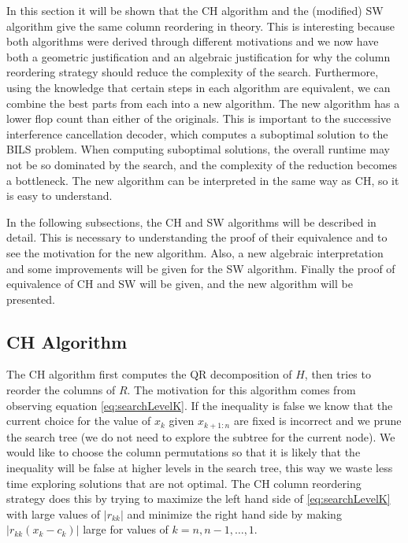 \documentclass[12pt,Bold,letterpaper]{mcgilletdclass}
\newcommand{\vsp}{\vspace{\baselineskip}}
\begin{document}
In this section it will be shown that the CH algorithm and the  (modified)  SW algorithm give the same
column reordering in theory. This is interesting because both algorithms were derived through different motivations
and we now have both a geometric justification and an algebraic justification 
for why the column reordering strategy should reduce the complexity of the search.
Furthermore, using the knowledge that certain steps in each algorithm are equivalent,
we can combine the best parts from each into a new algorithm. The new algorithm
has a lower flop count than either of the originals.
This is important to the successive interference cancellation decoder, 
which computes a suboptimal solution to the BILS problem. When computing suboptimal solutions, the overall runtime may not be so dominated by the search, and the complexity of the reduction becomes a bottleneck.
The new algorithm can be interpreted in the same way as CH,
so it is easy to understand. 

In the following subsections, the CH and SW algorithms will be described in detail. This is necessary to understanding the proof of their equivalence and to see the motivation for the new algorithm. Also, a new algebraic interpretation and some improvements will be given for the SW algorithm. Finally the proof of equivalence of CH and SW will be given, and the new algorithm will be presented.

\vsp \subsection{CH Algorithm} \label{subsec:CH}
The CH algorithm first computes the QR decomposition of $H$,
then  tries to reorder the columns of $R$.
The motivation for this algorithm comes from observing equation \eqref{eq:searchLevelK}.
If the inequality is false we know that the current choice for the value of
$x_k$ given $x_{k+1:n}$ are fixed is incorrect and we prune the search tree (we do not need to explore the subtree for the current node). We
would like to choose the column permutations so that it is likely that the
inequality will be false at higher levels in the search tree, this way we waste less time exploring solutions that are not optimal. The CH column reordering strategy
does this by trying to maximize the left hand side of  \eqref{eq:searchLevelK} with large values of $\left | r_{kk}
\right |$ and minimize the right hand side by making $\left | r_{kk}(x_k-c_k) \right |$
large for values of $k = n,n-1, \dots, 1$.
\end{document}
